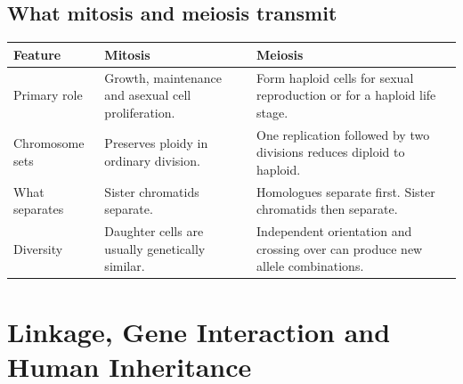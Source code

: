 \documentclass[12pt,a4paper]{article}
\begin{document}
\subsection{What mitosis and meiosis transmit}
\begin{tcolorbox}[tikzbox, title={Genetic transmission across generations}]
\centering
{}\par
\end{tcolorbox}

\par\vspace{5pt}
\begingroup
\setlength{\extrarowheight}{1pt}
\noindent\begin{tabularx}{\linewidth}{|B{3cm}|Y|Y|}
\hline
\textbf{Feature} & \textbf{Mitosis} & \textbf{Meiosis} \\ \hline
Primary role & Growth, maintenance and asexual cell proliferation. & Form haploid cells for sexual reproduction or for a haploid life stage. \\ \hline
Chromosome sets & Preserves ploidy in ordinary division. & One replication followed by two divisions reduces diploid to haploid. \\ \hline
What separates & Sister chromatids separate. & Homologues separate first. Sister chromatids then separate. \\ \hline
Diversity & Daughter cells are usually genetically similar. & Independent orientation and crossing over can produce new allele combinations. \\ \hline
\end{tabularx}\par
\endgroup
\section{Linkage, Gene Interaction and Human Inheritance}
\end{document}
